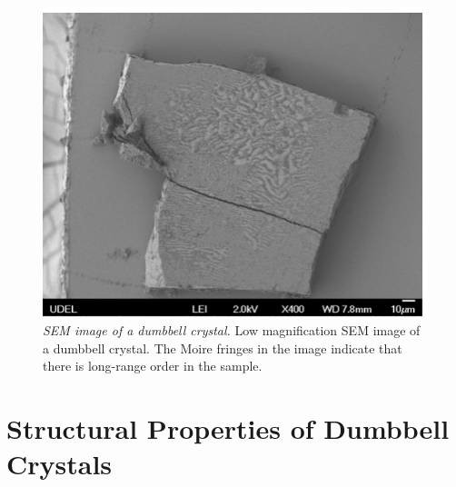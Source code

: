 \begin{figure}[htbp]
\centering
\includegraphics[width=1.0\textwidth]{figures/CsuppFigure6.pdf}
\caption{\label{fig:crystalSEM4} \emph{SEM image of a dumbbell crystal.}
	Low magnification SEM image of a dumbbell crystal. The Moire fringes in the image indicate that there is long-range order in the sample.}
\end{figure}


\section{Structural Properties of Dumbbell Crystals}

